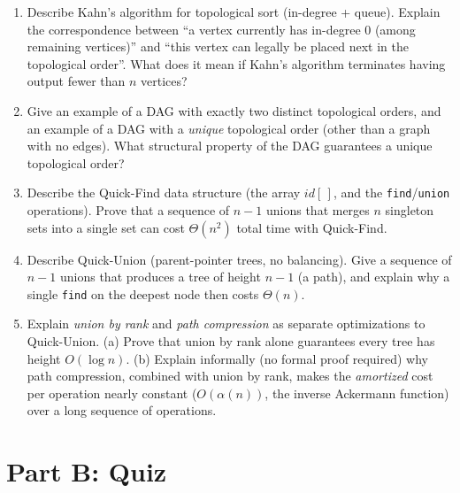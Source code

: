 \documentclass[11pt]{article}
\begin{document}
\begin{enumerate}[label=\textbf{A\arabic*.}, leftmargin=2.2em]
\item Describe Kahn's algorithm for topological sort (in-degree + queue). Explain the
correspondence between ``a vertex currently has in-degree 0 (among remaining vertices)''
and ``this vertex can legally be placed next in the topological order''. What does it
mean if Kahn's algorithm terminates having output fewer than $n$ vertices?

\item Give an example of a DAG with exactly two distinct topological orders, and an
example of a DAG with a \emph{unique} topological order (other than a graph with no
edges). What structural property of the DAG guarantees a unique topological order?

\item Describe the Quick-Find data structure (the array $id[\,]$, and the
\texttt{find}/\texttt{union} operations). Prove that a sequence of $n-1$ unions that
merges $n$ singleton sets into a single set can cost $\Theta(n^2)$ total time with
Quick-Find.

\item Describe Quick-Union (parent-pointer trees, no balancing). Give a sequence of $n-1$
unions that produces a tree of height $n-1$ (a path), and explain why a single
\texttt{find} on the deepest node then costs $\Theta(n)$.

\item Explain \emph{union by rank} and \emph{path compression} as separate optimizations
to Quick-Union. (a) Prove that union by rank alone guarantees every tree has height
$O(\log n)$. (b) Explain informally (no formal proof required) why path compression,
combined with union by rank, makes the \emph{amortized} cost per operation nearly
constant ($O(\alpha(n))$, the inverse Ackermann function) over a long sequence of
operations.

\end{enumerate}

\newpage
\section*{Part B: Quiz}
\end{document}

